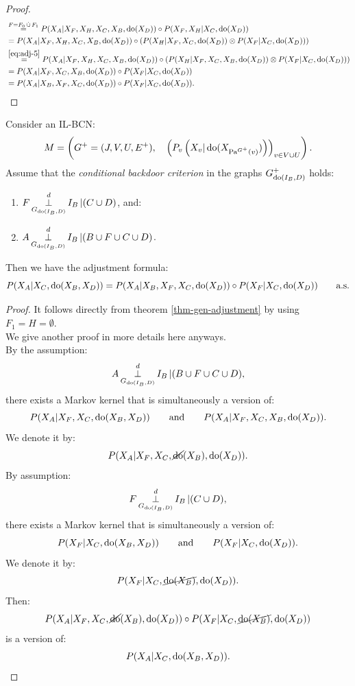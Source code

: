 \begin{Thm}
\begin{proof}
\begin{align}
  & \stackrel{F=F_0\,\dot{\cup}\, F_1}{=}
 P(X_A|X_F,X_H,X_C,X_B,\operatorname{do}(X_D))\circ P(X_F,X_H|X_C,\operatorname{do}(X_D)) \\
 & \stackrel{}{=}
 P(X_A|X_F,X_H,X_C,X_B,\operatorname{do}(X_D))\circ \left ( P(X_H|X_F,X_C,\operatorname{do}(X_D)) \otimes P(X_F|X_C,\operatorname{do}(X_D))  \right ) \\
  & \stackrel{\ref{eq:adj-5}}{=}
 P(X_A|X_F,X_H,X_C,X_B,\operatorname{do}(X_D))\circ \left ( P(X_H|X_F,X_C,X_B,\operatorname{do}(X_D)) \otimes P(X_F|X_C,\operatorname{do}(X_D))  \right ) \\
   & \stackrel{}{=}
 P(X_A|X_F,X_C,X_B,\operatorname{do}(X_D))\circ  P(X_F|X_C,\operatorname{do}(X_D)) \\
    & \stackrel{}{=}
 P(X_A|X_B,X_F,X_C,\operatorname{do}(X_D))\circ  P(X_F|X_C,\operatorname{do}(X_D)).
    \end{align}
\end{proof}
\end{Thm}


\begin{Cor}
    \label{thm-backdoor-cond-int}
    Consider an IL-BCN:
    \[ M = \left ( G^+=(J,V,U,E^+),\quad \left ( P_v\left ( X_v|\operatorname{do}(X_{\mathrm{Pa}^{G^+}(v)})   \right )\right )_{v\in V \cup U} \right ). \]
  Assume that the \emph{conditional backdoor criterion} in the graphs $G^+_{\operatorname{do}(I_B,D)}$ holds:
\begin{enumerate}
    \item $\displaystyle F \operatorname*{\perp}^d_{G_{\operatorname{do}(I_B,D)}} I_B  \operatorname*{|} (C \cup D)$, and:
    \item $\displaystyle A \operatorname*{\perp}^d_{G_{\operatorname{do}(I_B,D)}} I_B  \operatorname*{|} (B \cup F \cup C \cup D)$.
\end{enumerate}
Then we have the adjustment formula:
\[ P(X_A|X_C,\operatorname{do}(X_B,X_D)) = 
    P(X_A|X_B,X_F,X_C,\operatorname{do}(X_D)) \circ P(X_F|X_C,\operatorname{do}(X_D)) \qquad \text{a.s.}
\]
\begin{proof}
    It follows directly from theorem \ref{thm-gen-adjustment} by using $F_1=H=\emptyset$.\\
    We give another proof in more details here anyways.\\
    By the assumption:
 \[ A \operatorname*{\perp}^d_{G_{\operatorname{do}(I_B,D)}} I_B  \operatorname*{|} (B \cup F \cup C \cup D),\]
 there exists a Markov kernel that is simultaneously a version of:
 \[ P(X_A|X_F,X_C, \operatorname{do}(X_B,X_D)) \qquad\text{and}\qquad P(X_A|X_F,X_C, X_B,\operatorname{do}(X_D)).\]
 We denote it by:
 \[ P(X_A|X_F,X_C, \cancel{\operatorname{do}}(X_B),\operatorname{do}(X_D)). \]
 By assumption:
 \[F \operatorname*{\perp}^d_{G_{\operatorname{do}(I_B,D)}} I_B  \operatorname*{|} (C \cup D),\]
 there exists a Markov kernel that is simultaneously a version of:
 \[ P(X_F|X_C, \operatorname{do}(X_B,X_D)) \qquad\text{and}\qquad P(X_F|X_C,\operatorname{do}(X_D)).\]
 We denote it by:
 \[ P(X_F|X_C,\cancel{\operatorname{do}(X_B)},\operatorname{do}(X_D)). \]
 Then:
 \[P(X_A|X_F,X_C, \cancel{\operatorname{do}}(X_B),\operatorname{do}(X_D)) \circ P(X_F|X_C,\cancel{\operatorname{do}(X_B)},\operatorname{do}(X_D)) \]
 is a version of:
 \[ P(X_A|X_C,\operatorname{do}(X_B,X_D)).\]
\end{proof}
\end{Cor}


